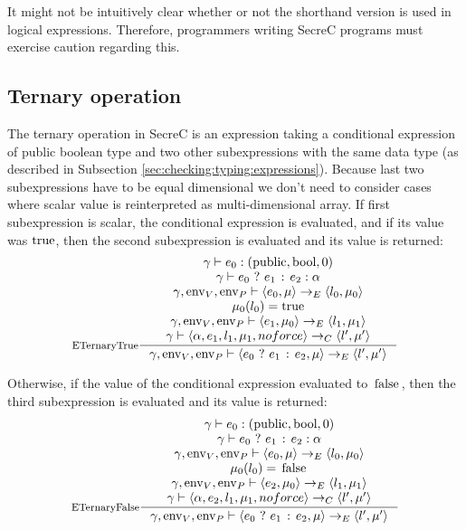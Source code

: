 \documentclass[a4paper, 10pt, draft]{report}
\DeclareMathOperator*{\env}{env}
\newcommand{\mycode}[1]{\ensuremath{\mbox{\lstinline{#1}}}}
\begin{document}
It might not be intuitively clear whether or not the shorthand version is used
in logical expressions. Therefore, programmers writing SecreC programs must
exercise caution regarding this.

\subsection{Ternary operation}\label{sec:semantics:expr:ternary}

The ternary operation in SecreC is an expression taking a conditional
expression of public boolean type and two other subexpressions with the same
data type (as described in Subsection \ref{sec:checking:typing:expressions}).
Because last two subexpressions have to be equal dimensional we don't need to consider
cases where scalar value is reinterpreted as multi-dimensional array. If first
subexpression is scalar, the conditional expression is evaluated, and if its
value was \mycode{true}, then the second subexpression is evaluated and its
value is returned:
\[\inference[ETernaryTrue]{
  \gamma |- e_0 : \left( \mycode{public}, \mycode{bool}, 0 \right) \\
  \gamma |- e_0\ \mycode{?}\ e_1\ \mycode{:}\ e_2 : \alpha \\
  \gamma, \env_V, \env_P |- \left<e_0, \mu \right> \to_E \left< l_0, \mu_0 \right> \\
  \mu_0(l_0) = \mycode{true}\\
  \gamma, \env_V, \env_P |- \left< e_1, \mu_0 \right> \to_E \left< l_1, \mu_1 \right> \\
  \gamma |- \left< \alpha, e_1, l_1, \mu_1, noforce \right> \to_C \left< l', \mu' \right>
}{
  \gamma, \env_V, \env_P |- \left< e_0\ \mycode{?}\ e_1\ \mycode{:}\ e_2, \mu \right> \to_E \left< l', \mu' \right>
}\]

Otherwise, if the value of the conditional expression evaluated to
\mycode{false}, then the third subexpression is evaluated and its value is
returned:
\[\inference[ETernaryFalse]{
  \gamma |- e_0 : \left( \mycode{public}, \mycode{bool}, 0 \right) \\
  \gamma |- e_0\ \mycode{?}\ e_1\ \mycode{:}\ e_2 : \alpha \\
  \gamma, \env_V, \env_P |- \left<e_0, \mu \right> \to_E \left< l_0, \mu_0 \right> \\
  \mu_0(l_0) = \mycode{false}\\
  \gamma, \env_V, \env_P |- \left< e_2, \mu_0 \right> \to_E \left< l_1, \mu_1 \right> \\
  \gamma |- \left< \alpha, e_2, l_1, \mu_1, noforce \right> \to_C \left< l', \mu' \right>
}{
  \gamma, \env_V, \env_P |- \left< e_0\ \mycode{?}\ e_1\ \mycode{:}\ e_2, \mu \right> \to_E \left< l', \mu' \right>
}\]
\end{document}
